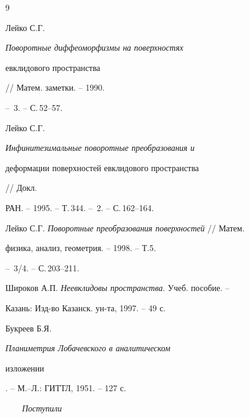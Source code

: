 \begin{thebibliography}{9} 


 




Лейко С.Г. {\em Поворотные диффеоморфизмы на поверхностях 


евклидового пространства} // Матем. заметки. -- 1990. 


-- \No\,3. -- С.\,52--57. 




Лейко С.Г. {\em Инфинитезимальные поворотные преобразования и 


деформации поверхностей евклидового пространства} // Докл. 


РАН. -- 1995. -- Т.\,344. -- \No\,2. -- С.\,162--164. 




Лейко С.Г. {\em Поворотные преобразования поверхностей} // Матем. 


физика, анализ, геометрия. -- 1998. -- Т.5. 


-- \No\,3/4. -- С.\,203--211. 




Широков А.П. {\em Неевклидовы пространства}. Учеб. пособие. -- 


Казань: Изд-во Казанск. ун-та, 1997. -- 49 с. 




Букреев Б.Я. {\em Планиметрия Лобачевского в аналитическом 


изложении}. -- М.--Л.: ГИТТЛ, 1951. -- 127 с. 


 


\end{thebibliography} 


 


\vskip 2cm 


 


% 


{$\qquad$\it Поступили} 






\label{end} 


 


